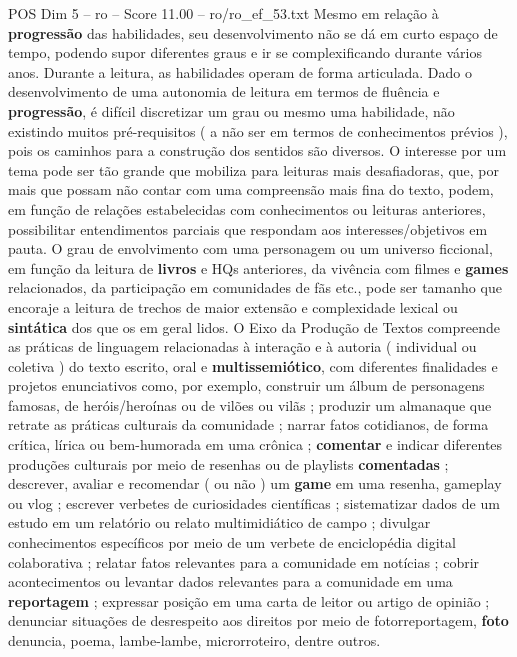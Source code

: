 \begin{textsample}{POS Dim 5 – ro – Score 11.00 – ro/ro\_ef\_53.txt}
Mesmo em relação à \textbf{progressão} das habilidades, seu desenvolvimento não se dá em curto espaço de tempo, podendo supor diferentes graus e ir se complexificando durante vários anos.
Durante a leitura, as habilidades operam de forma articulada.
Dado o desenvolvimento de uma autonomia de leitura em termos de fluência e \textbf{progressão}, é difícil discretizar um grau ou mesmo uma habilidade, não existindo muitos pré-requisitos ( a não ser em termos de conhecimentos prévios ), pois os caminhos para a construção dos sentidos são diversos.
O interesse por um tema pode ser tão grande que mobiliza para leituras mais desafiadoras, que, por mais que possam não contar com uma compreensão mais fina do texto, podem, em função de relações estabelecidas com conhecimentos ou leituras anteriores, possibilitar entendimentos parciais que respondam aos interesses/objetivos em pauta.
O grau de envolvimento com uma personagem ou um universo ficcional, em função da leitura de \textbf{livros} e HQs anteriores, da vivência com filmes e \textbf{games} relacionados, da participação em comunidades de fãs etc., pode ser tamanho que encoraje a leitura de trechos de maior extensão e complexidade lexical ou \textbf{sintática} dos que os em geral lidos.
O Eixo da Produção de Textos compreende as práticas de linguagem relacionadas à interação e à autoria ( individual ou coletiva ) do texto escrito, oral e \textbf{multissemiótico}, com diferentes finalidades e projetos enunciativos como, por exemplo, construir um álbum de personagens famosas, de heróis/heroínas ou de vilões ou vilãs ; produzir um almanaque que retrate as práticas culturais da comunidade ; narrar fatos cotidianos, de forma crítica, lírica ou bem-humorada em uma crônica ; \textbf{comentar} e indicar diferentes produções culturais por meio de resenhas ou de playlists \textbf{comentadas} ; descrever, avaliar e recomendar ( ou não ) um \textbf{game} em uma resenha, gameplay ou vlog ; escrever verbetes de curiosidades científicas ; sistematizar dados de um estudo em um relatório ou relato multimidiático de campo ; divulgar conhecimentos específicos por meio de um verbete de enciclopédia digital colaborativa ; relatar fatos relevantes para a comunidade em notícias ; cobrir acontecimentos ou levantar dados relevantes para a comunidade em uma \textbf{reportagem} ; expressar posição em uma carta de leitor ou artigo de opinião ; denunciar situações de desrespeito aos direitos por meio de fotorreportagem, \textbf{foto} denuncia, poema, lambe-lambe, microrroteiro, dentre outros.

\end{textsample}
